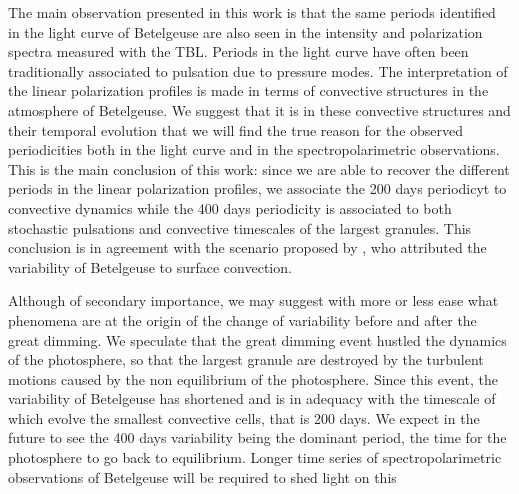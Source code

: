 \documentclass{aa}
\begin{document}
The main observation  presented in this work is that the same periods identified in the light curve of Betelgeuse are also seen in the intensity and polarization
spectra measured with the TBL. Periods in the light curve have often been traditionally associated to pulsation due to pressure modes.
The interpretation of the linear polarization profiles is made in terms of convective structures in the atmosphere of Betelgeuse. We suggest 
that it is in these convective structures and their temporal evolution that we will find the true reason for the observed periodicities both 
in the light curve and in the spectropolarimetric observations. This is the main conclusion of this work: since we are able to recover the different periods in the linear polarization profiles, we associate the 200 days periodicyt to convective dynamics while the 400 days periodicity is associated to both stochastic pulsations and convective timescales of the largest granules. This conclusion is in agreement with the scenario proposed by \cite{gray_mass_2008}, who attributed the variability of Betelgeuse to surface convection. 

Although of secondary importance, we may suggest with more or less ease what phenomena are at the origin of the change of variability before and after the great dimming. We speculate that the great dimming event hustled the dynamics of the photosphere, so that the largest granule are destroyed by the turbulent motions caused by the non equilibrium of the photosphere. Since this event, the variability of Betelgeuse has shortened and is in adequacy with the timescale of which evolve the smallest convective cells, that is 200 days. We expect in the future to see the 400 days variability being the dominant period, the time for the photosphere to go back to equilibrium. Longer time 
series of spectropolarimetric observations of Betelgeuse will be required to shed light on this
\end{document}
